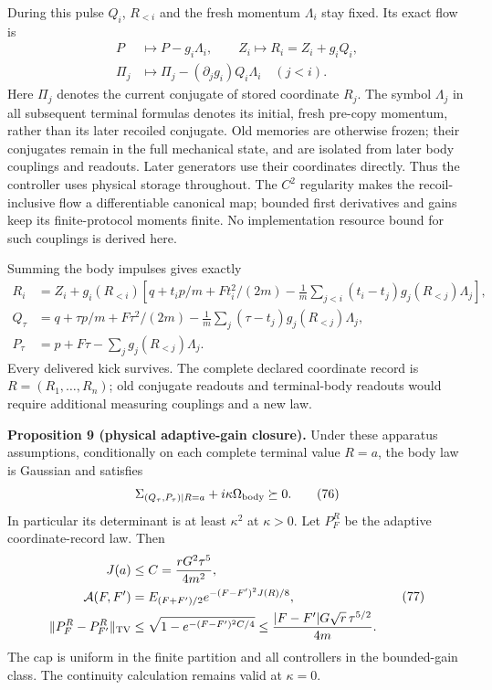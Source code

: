 \documentclass[11pt,a4paper]{article}
\begin{document}
During this pulse \(Q_i\), \(R_{<i}\) and the fresh momentum
\(\Lambda_i\) stay fixed. Its exact flow is \[\begin{aligned}
P&\longmapsto P-g_i\Lambda_i,\qquad
Z_i\longmapsto R_i=Z_i+g_iQ_i,\\
\Pi_j&\longmapsto\Pi_j-(\partial_jg_i)Q_i\Lambda_i
                         \quad(j<i).
\end{aligned}\tag{74}\] Here \(\Pi_j\) denotes the current conjugate of
stored coordinate \(R_j\). The symbol \(\Lambda_j\) in all subsequent
terminal formulas denotes its initial, fresh pre-copy momentum, rather
than its later recoiled conjugate. Old memories are otherwise frozen;
their conjugates remain in the full mechanical state, and are isolated
from later body couplings and readouts. Later generators use their
coordinates directly. Thus the controller uses physical storage
throughout. The \(C^2\) regularity makes the recoil-inclusive flow a
differentiable canonical map; bounded first derivatives and gains keep
its finite-protocol moments finite. No implementation resource bound for
such couplings is derived here.

Summing the body impulses gives exactly \[\begin{aligned}
R_i&=Z_i+g_i(R_{<i})\left[q+t_ip/m+Ft_i^2/(2m)
 -\frac1m\sum_{j<i}(t_i-t_j)g_j(R_{<j})\Lambda_j\right],\\
Q_\tau&=q+\tau p/m+F\tau^2/(2m)
 -\frac1m\sum_j(\tau-t_j)g_j(R_{<j})\Lambda_j,\\
P_\tau&=p+F\tau-\sum_jg_j(R_{<j})\Lambda_j.
\end{aligned}\tag{75}\] Every delivered kick survives. The complete
declared coordinate record is \(R=(R_1,\ldots,R_n)\); old conjugate
readouts and terminal-body readouts would require additional measuring
couplings and a new law.

\textbf{Proposition 9 (physical adaptive-gain closure).} Under these
apparatus assumptions, conditionally on each complete terminal value
\(R=a\), the body law is Gaussian and satisfies
\[\Sigma_{(Q_\tau,P_\tau)\mid R=a}
             +i\kappa\Omega_{\rm body}\succeq0.\tag{76}\] In particular
its determinant is at least \(\kappa^2\) at \(\kappa>0\). Let \(P_F^R\)
be the adaptive coordinate-record law. Then \[\begin{aligned}
J(a)&\le C=\frac{rG^2\tau^5}{4m^2},\\
\mathcal A(F,F')&=E_{(F+F')/2}
                    e^{-(F-F')^2J(R)/8},\\
\|P_F^R-P_{F'}^R\|_{\rm TV}
&\le\sqrt{1-e^{-(F-F')^2C/4}}
 \le\frac{|F-F'|G\sqrt r\,\tau^{5/2}}{4m}.
\end{aligned}\tag{77}\] The cap is uniform in the finite partition and
all controllers in the bounded-gain class. The continuity calculation
remains valid at \(\kappa=0\).
\end{document}
